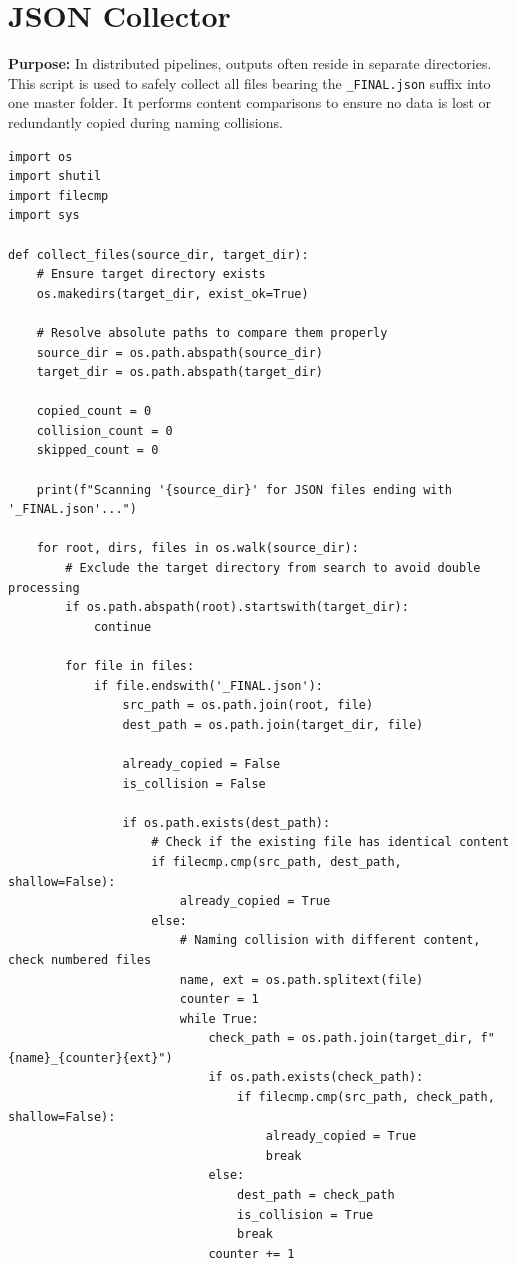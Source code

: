 \documentclass[11pt]{article}
\begin{document}
\section{JSON Collector} \label{sec:collector}
\textbf{Purpose:} In distributed pipelines, outputs often reside in separate directories. This script is used to safely collect all files bearing the \texttt{\_FINAL.json} suffix into one master folder. It performs content comparisons to ensure no data is lost or redundantly copied during naming collisions.

\begin{lstlisting}[style=pythoncode, caption={json\_collector.py}]
import os
import shutil
import filecmp
import sys

def collect_files(source_dir, target_dir):
    # Ensure target directory exists
    os.makedirs(target_dir, exist_ok=True)
    
    # Resolve absolute paths to compare them properly
    source_dir = os.path.abspath(source_dir)
    target_dir = os.path.abspath(target_dir)
    
    copied_count = 0
    collision_count = 0
    skipped_count = 0
    
    print(f"Scanning '{source_dir}' for JSON files ending with '_FINAL.json'...")
    
    for root, dirs, files in os.walk(source_dir):
        # Exclude the target directory from search to avoid double processing
        if os.path.abspath(root).startswith(target_dir):
            continue
            
        for file in files:
            if file.endswith('_FINAL.json'):
                src_path = os.path.join(root, file)
                dest_path = os.path.join(target_dir, file)
                
                already_copied = False
                is_collision = False
                
                if os.path.exists(dest_path):
                    # Check if the existing file has identical content
                    if filecmp.cmp(src_path, dest_path, shallow=False):
                        already_copied = True
                    else:
                        # Naming collision with different content, check numbered files
                        name, ext = os.path.splitext(file)
                        counter = 1
                        while True:
                            check_path = os.path.join(target_dir, f"{name}_{counter}{ext}")
                            if os.path.exists(check_path):
                                if filecmp.cmp(src_path, check_path, shallow=False):
                                    already_copied = True
                                    break
                            else:
                                dest_path = check_path
                                is_collision = True
                                break
                            counter += 1
                

\end{lstlisting}
\end{document}
